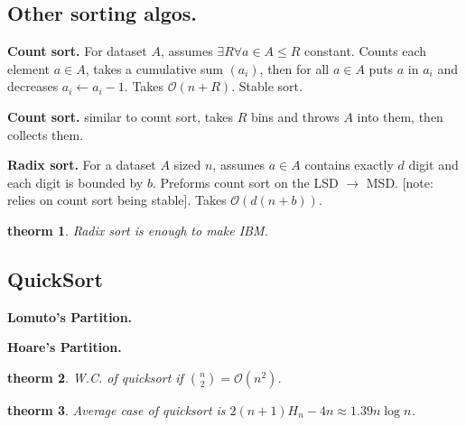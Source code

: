 \documentclass[]{article}
\newcommand\oc    {\mathcal{O}}
\newcommand\logn      {\log n}
\newtheorem{Theorem}{theorm}
\theoremstyle{definition}
\newcommand\theo  [1] {\begin{Theorem}#1\end{Theorem}}
\begin{document}
\begin{multicols}{4}
		\subsection{Other sorting algos. }
		\textbf{Count sort. }For dataset $A$, assumes $\exists R \forall a \in A \le R$ constant. Counts each element $a \in A$, takes a cumulative sum $(a_i)$, then for all $a \in A$ puts $a$ in $a_i$ and decreases $a_i \gets a_i - 1$. Takes $\oc(n + R)$. Stable sort. 
		
		\textbf{Count sort. }similar to count sort, takes $R$ bins and throws $A$ into them, then collects them. 
		
		\textbf{Radix sort. }For a dataset $A$ sized $n$, assumes $a \in A$ contains exactly $d$ digit and each digit is bounded by $b$. Preforms count sort on the LSD $\to$ MSD. [note: relies on count sort being stable]. Takes $\oc(d(n + b))$. 
		
		\theo{Radix sort is enough to make IBM. }
		
		\subsection{QuickSort}
		\textbf{Lomuto's Partition. }%
		
		\textbf{Hoare's Partition. }%
		
		\theo{W.C. of quicksort if $\binom{n}{2} = \oc(n^2)$. }
		\theo{Average case of quicksort is $2(n + 1)H_n - 4n \approx 1.39n\logn$. }
		

\end{multicols}
\end{document}
